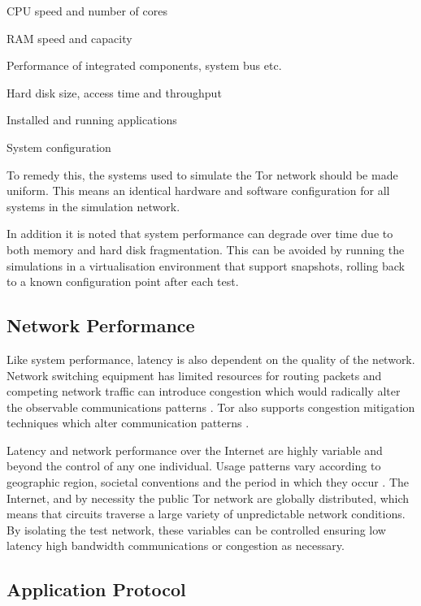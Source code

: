 \documentclass{ecuthesis}
\begin{document}
\begin{itemize*}
  \item CPU speed and number of cores
  \item RAM speed and capacity
  \item Performance of integrated components, system bus etc.
  \item Hard disk size, access time and throughput
  \item Installed and running applications
  \item System configuration
\end{itemize*}

To remedy this, the systems used to simulate the Tor network should be made
uniform. This means an identical hardware and software configuration for all
systems in the simulation network.

In addition it is noted that system performance can degrade over time due to
both memory and hard disk fragmentation. This can be avoided by running the
simulations in a virtualisation environment that support snapshots, rolling
back to a known configuration point after each test.

\subsection{Network Performance}

Like system performance, latency is also dependent on the quality of the
network. Network switching equipment has limited resources for routing packets
and competing network traffic can introduce congestion which would radically
alter the observable communications patterns \parencite{Jacobson:1995p6768}.
Tor also supports congestion mitigation techniques which alter communication
patterns \parencite[8]{Dingledine:2004p314}.

Latency and network performance over the Internet are highly variable and
beyond the control of any one individual. Usage patterns vary according to
geographic region, societal conventions and the period in which they occur
\parencite{Thompson97wide-areainternet,Ken03longitudinalstudy}. The Internet,
and by necessity the public Tor network are globally distributed, which means
that circuits traverse a large variety of unpredictable network conditions. By
isolating the test network, these variables can be controlled ensuring low
latency high bandwidth communications or congestion as necessary.

\subsection{Application Protocol}
\end{document}
